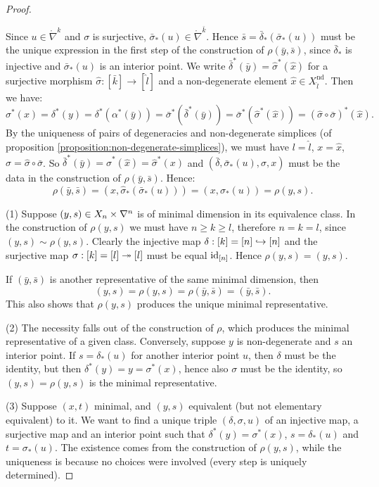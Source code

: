\begin{proof}
\begin{claimproof}
Since $u\in\ring\nabla^{k}$ and $\sigma$ is surjective, $\bar\sigma_*(u)\in\ring\nabla^{\bar k}$. Hence $\bar s=\bar\delta_*(\bar\sigma_*(u))$ must be the unique expression in the first step of the construction of $\rho(\bar y,\bar s)$, since $\bar\delta_*$ is injective and $\bar\sigma_*(u)$ is an interior point. We write $\bar\delta^*(\bar y)=\hat\sigma^*(\hat x)$ for a surjective morphism $\hat\sigma:[\bar k]\to[\hat l]$ and a non-degenerate element $\hat x\in X_{\hat l}^\text{nd}$. Then we have:
\[\sigma^*(x)=\delta^*(y)=\delta^*(\alpha^*(\bar y))=\bar\sigma^*(\bar\delta^*(\bar y))=\bar\sigma^*(\hat\sigma^*(\hat x))=(\hat\sigma\circ\bar\sigma)^*(\hat x).\]
By the uniqueness of pairs of degeneracies and non-degenerate simplices (of proposition \ref{proposition:non-degenerate-simplices}), we must have $l=\hat l$, $x=\hat x$, $\sigma=\hat\sigma\circ\bar\sigma$. So $\bar\delta^*(\bar y)=\hat\sigma^*(\hat x)=\hat\sigma^*(x)$ and $(\bar\delta,\bar\sigma_*(u),\hat\sigma,x)$ must be the data in the construction of $\rho(\bar y,\bar s)$. Hence:
\[\rho(\bar y,\bar s)=(x,\hat\sigma_*(\bar\sigma_*(u)))=(x,\sigma_*(u))=\rho(y,s).\]
\end{claimproof}

(1) Suppose $(y,s)\in X_n\times\nabla^n$ is of minimal dimension in its equivalence class. In the construction of $\rho(y,s)$ we must have $n\ge k\ge l$, therefore $n=k=l$, since $(y,s)\sim \rho(y,s)$. Clearly the injective map $\delta:[k]=[n]\hookrightarrow[n]$ and the surjective map $\sigma:[k]=[l]\twoheadrightarrow[l]$ must be equal $\operatorname{id}_{[n]}$. Hence $\rho(y,s)=(y,s)$.

If $(\bar y,\bar s)$ is another representative of the same minimal dimension, then
\[(y,s)=\rho(y,s)=\rho(\bar y,\bar s)=(\bar y,\bar s).\]
This also shows that $\rho(y,s)$ produces the unique minimal representative.

(2) The necessity falls out of the construction of $\rho$, which produces the minimal representative of a given class. Conversely, suppose $y$ is non-degenerate and $s$ an interior point. If $s=\delta_*(u)$ for another interior point $u$, then $\delta$ must be the identity, but then $\delta^*(y)=y=\sigma^*(x)$, hence also $\sigma$ must be the identity, so $(y,s)=\rho(y,s)$ is the minimal representative.

(3) Suppose $(x,t)$ minimal, and $(y,s)$ equivalent (but not elementary equivalent) to it. We want to find a unique triple $(\delta,\sigma,u)$ of an injective map, a surjective map and an interior point such that $\delta^*(y)=\sigma^*(x)$, $s=\delta_*(u)$ and $t=\sigma_*(u)$. The existence comes from the construction of $\rho(y,s)$, while the uniqueness is because no choices were involved (every step is uniquely determined).
\end{proof}

